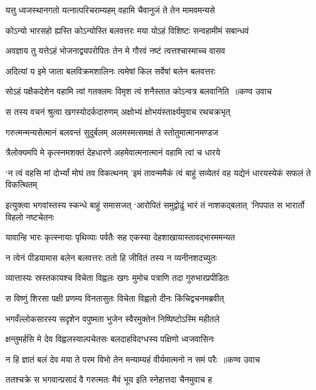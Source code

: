 \twolineshloka
{यत्तु ध्वजस्थानगतो यत्नात्परिचराम्यहम्}
{वहामि चैवानुजं ते तेन मामवमन्यसे}


\twolineshloka
{कोऽन्यो भारसहो ह्यस्ति कोऽन्योस्ति बलवत्तरः}
{मया योऽहं विशिष्टः सन्वहामीमं सबान्धवं}


\twolineshloka
{अवज्ञाय तु यत्तेऽहं भोजनाद्व्यपरोपितः}
{तेन मे गौरवं नष्टं त्वत्तश्चास्माच्च वासव}


\twolineshloka
{अदित्यां य इमे जाता बलविक्रमशालिनः}
{त्वमेषां किल सर्वेषां बलेन बलवत्तरः}


\threelineshloka
{सोऽहं पक्षैकदेशेन वहामि त्वां गतक्लमः}
{विमृश त्वं शनैस्तात कोऽन्वत्र बलवानिति ॥कण्व उवाच}
{}


\twolineshloka
{स तस्य वचनं श्रुत्वा खगस्योदर्कदारुणम्}
{अक्षोभ्यं क्षोभयंस्तार्क्ष्यमुवाच रथचक्रभृत्}


\twolineshloka
{गरुत्मन्मन्यसेत्मानं बलवन्तं सुदुर्बलम्}
{अलमस्मत्समक्षं ते स्तोतुमात्मानमण्डज}


\twolineshloka
{त्रैलोक्यमपि मे कृत्स्नमशक्तं देहधारणे}
{अहमेवात्मनात्मानं वहामि त्वां च धारये}


\threelineshloka
{`न त्वं वहसि मां दोर्भ्यां मोघं तव विकत्थनम्}
{'इमं तावन्ममैकं त्वं बाहुं सव्येतरं वह}
{यद्येनं धारयस्येकं सफलं ते विकत्थितम्}


\threelineshloka
{इत्युक्त्वा भगवांस्तस्य स्कन्धे बाहुं समासजत्}
{`आरोपितं समुद्वोढुं भारं तं नाशकद्बलात्}
{'निपपात स भारार्तो विहलो नष्टचेतनः}


\twolineshloka
{यावान्हि भारः कृत्स्नायाः पृथिव्याः पर्वतैः सह}
{एकस्या देहशाखायास्तावद्भारममन्यत}


\twolineshloka
{न त्वेनं पीडयामास बलेन बलवत्तरः}
{ततो हि जीवितं तस्य न व्यनीनशदच्युतः}


\twolineshloka
{व्यात्तास्यः स्रस्तकायश्च विचेता विह्वलः खगः}
{मुमोच पत्राणि तदा गुरुभारप्रपीडितः}


\twolineshloka
{स विष्णुं शिरसा पक्षी प्रणम्य विनतासुतः}
{विचेता विह्वलो दीनः किंचिद्वचनमब्रवीत्}


\twolineshloka
{भगवँल्लोकसारस्य सदृशेन वपुष्मता}
{भुजेन स्वैरमुक्तेन निष्पिष्टोऽस्मि महीतले}


\twolineshloka
{क्षन्तुमर्हसि मे देव विह्वलस्याल्पचेतसः}
{बलदाहविदग्धस्य पक्षिणो ध्वजवासिनः}


\threelineshloka
{न हि ज्ञातं बलं देव मया ते परम विभो}
{तेन मन्याम्यहं वीर्यमात्मनो न समं परैः ॥कण्व उवाच}
{}


\twolineshloka
{ततश्चक्रे स भगवान्प्रसादं वै गरुत्मतः}
{मैवं भूय इति स्नेहात्तदा चैनमुवाच ह}


